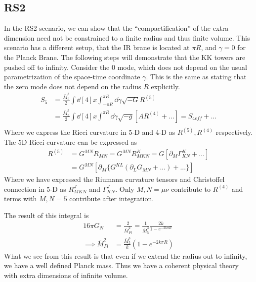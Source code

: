 \documentclass[12pt]{article}
\newcommand{\pd}{\partial}
\begin{document}
\subsection{RS2}
In the RS2 scenario, we can show that the ``compactification'' of the extra
dimension need not be constrained to a finite radius and thus finite volume.
This scenario has a different setup, that the IR brane is located at $\pi R$,
and $\gamma = 0$ for the Planck Brane. The following steps will demonstrate that
the KK towers are pushed off to infinity.
Consider the 0 mode, which does not depend on the usual parametrization of the
space-time coordinate $\gamma$. This is the same as stating that the zero mode
does not depend on the radius $R$ explicitly.
\begin{align}
    S_5 &= \frac{\bar{M}_5^3}{2} \int \dd[4]{x} \int^{\pi R}_{-\pi R}
    \dd{\gamma} \sqrt{-G}R^{(5)} \\
    &= \frac{\bar{M}_5^3}{2} \int \dd[4]{x} \int^{\pi R}
    \dd{\gamma} \sqrt{-g}[AR^{(4)} + ...] = S_{4 eff} + ...\\
\end{align}
Where we express the Ricci curvature in 5-D and 4-D as $R^{(5)}, R^{(4)}$
respectively. The 5D Ricci curvature can be expressed as
\begin{align}
    R^{(5)} &= G^{MN}R_{MN} = G^{MN}R^K_{MKN} = G[ \pd_M \Gamma^K_{KN} + ... ] \\
            &= G^{MN}[ \pd_M \{ G^{KL}( \pd_L G_{MN} + ... ) + ... \} ]
\end{align}
Where we have expressed the Riumann curvature tensors and Christoffel
connection in 5-D as $R^J_{MKN}$ and $\Gamma^J_{KN}$. Only $M,N = \mu\nu$
contribute to $R^{(4)}$ and terms with $M,N=5$ contribute after integration.

The result of this integral is
\begin{align}
    16\pi G_N &= \frac{2}{\bar{M}_{Pl}^2} = \frac{1}{\bar{M}^3_5} \frac{2k}{1 -
    e^{-2k\pi R}} \\
    \implies \bar{M}^2_{Pl} &= \frac{\bar{M}^3_5}{k} (1 - e^{-2k\pi R})
\end{align}
What we see from this result is that even if we extend the radius out to
infinity, we have a well defined Planck mass. Thus we have a coherent physical
theory with extra dimensions of infinite volume. 
\end{document}
